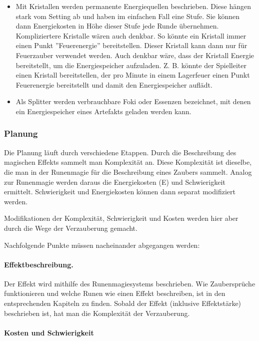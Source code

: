 \documentclass{article}
\begin{document}
\begin{itemize}
\item Mit Kristallen werden permanente Energiequellen beschrieben. Diese hängen stark vom Setting ab und haben im einfachen Fall eine Stufe. Sie können dann Energiekosten in Höhe dieser Stufe jede Runde übernehmen. Kompliziertere Kristalle wären auch denkbar. So könnte ein Kristall immer einen Punkt ''Feuerenergie'' bereitstellen. Dieser Kristall kann dann nur für Feuerzauber verwendet werden. Auch denkbar wäre, dass der Kristall Energie bereitstellt, um die Energiespeicher aufzuladen. Z. B. könnte der Spielleiter einen Kristall bereitstellen, der pro Minute in einem Lagerfeuer einen Punkt Feuerenergie bereitstellt und damit den Energiespeicher auflädt.
\item Als Splitter werden verbrauchbare Foki oder Essenzen bezeichnet, mit denen ein Energiespeicher eines Artefakts geladen werden kann.
\end{itemize}

\subsubsection{Planung}

Die Planung läuft durch verschiedene Etappen. Durch die Beschreibung des magischen Effekts sammelt man Komplexität an.
Diese Komplexität ist dieselbe, die man in der Runenmagie für die Beschreibung eines Zaubers sammelt.
Analog zur Runenmagie werden daraus die Energiekosten (E) und Schwierigkeit ermittelt. Schwierigkeit und Energiekosten
können dann separat modifiziert werden.

Modifikationen der Komplexität, Schwierigkeit und Kosten werden hier aber durch die Wege der Verzauberung gemacht.

Nachfolgende Punkte müssen nacheinander abgegangen werden:

\paragraph{Effektbeschreibung.}

Der Effekt wird mithilfe des Runenmagiesystems beschrieben. Wie Zaubersprüche funktionieren und welche Runen wie
einen Effekt beschreiben, ist in den entsprechenden Kapiteln zu finden. Sobald der Effekt (inklusive Effektstärke)
beschrieben ist, hat man die Komplexität der Verzauberung.

\paragraph{Kosten und Schwierigkeit}
\end{document}
